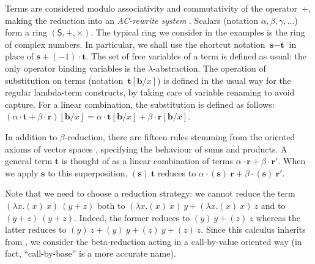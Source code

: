 \documentclass[colorlinks=true,linkcolor=black,urlcolor=black,citecolor=blue,submission,copyright,creativecommons]{eptcs}
\newcommand{\ve}[1]{\mathrm{\textbf{#1}}}
\newcommand{\Sc}{\mathsf{S}}
\begin{document}
Terms are considered modulo associativity and commutativity of
the operator~$+$, making the reduction into an {\em AC-rewrite system}
\cite{JouannaudKirchnerSIAM86}.
Scalars (notation $\alpha,\beta,\gamma,\dots$) form a ring
$(\Sc,+,\times)$.
The typical ring we consider in the examples is
the ring of complex numbers. In particular, we shall use the shortcut
notation $\ve{s}-\ve{t}$ in place of $\ve{s}+(-1)\cdot\ve{t}$.
The set of free variables of a term is defined
as usual: the only operator binding variables is the
$\lambda$-abstraction.
The operation of substitution on terms (notation~$\ve{t}[{\ve b}/x]$)
is defined in the usual way for the regular lambda-term constructs, by
taking care of variable renaming to avoid capture. For a linear
combination, the substitution is defined as follows: $(\alpha\cdot\ve
t+\beta\cdot\ve r)[{\ve b}/x]=\alpha\cdot\ve t[{\ve b}/x]+\beta\cdot\ve r[{\ve
  b}/x]$.

In addition to $\beta$-reduction, there are fifteen rules stemming from the oriented axioms of vector spaces \cite{ArrighiDowekRTA08}, specifying
the behaviour of sums and products.
A general term $\ve t$ is thought
of as a linear combination of terms $\alpha\cdot\ve r+\beta\cdot\ve
r'$. When we apply $\ve s$ to this superposition, $(\ve s)~\ve t$
reduces to $\alpha\cdot(\ve s)~\ve r + \beta\cdot(\ve s)~\ve r'$.

Note that we need to choose a reduction strategy: we cannot reduce the
term $(\lambda x.(x)~x)~(y+z)$ both to $(\lambda x.(x)~x)~y+(\lambda
x.(x)~x)~z$ and to $(y+z)~(y+z)$. Indeed, the former reduces to
$(y)~y+(z)~z$ whereas the latter reduces to
$(y)~z+(y)~y+(z)~y+(z)~z$. Since this calculus inherits from
\cite{ArrighiDiazcaroQPL09,ArrighiDowekRTA08,DiazcaroPetitWoLLIC12}, we
consider the beta-reduction acting in a call-by-value oriented way (in fact, ``call-by-base'' is a more accurate name).
\end{document}

